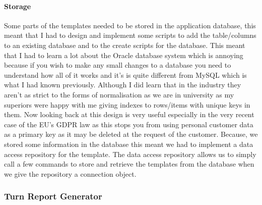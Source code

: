 {{		\paragraph{Storage}{Some parts of the templates needed to be stored in the application database, this meant that I had to design and implement some scripts to add the table/columns to an existing database and to the create scripts for the database. This meant that I had to learn a lot about the Oracle database system which is annoying because if you wish to make any small changes to a database you need to understand how all of it works and it's is quite different from MySQL which is what I had known previously. Although I did learn that in the industry they aren't as strict to the forms of normalisation as we are in university as my superiors were happy with me giving indexes to rows/items with unique keys in them. Now looking back at this design is very useful especially in the very recent case of the EU's GDPR law as this stops you from using personal customer data as a primary key as it may be deleted at the request of the customer. Because, we stored some information in the database this meant we had to implement a data access repository for the template. The data access repository allows us to simply call a few commands to store and retrieve the templates from the database when we give the repository a connection object.}
	}
	\subsubsection*{Turn Report Generator}
}